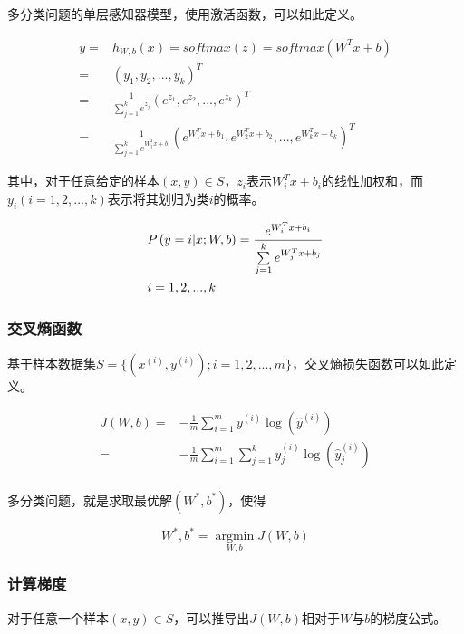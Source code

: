 \begin{content}
\begin{content}
多分类问题的单层感知器模型，使用激活函数，可以如此定义。

\[\begin{aligned}
  y =  & {h_{W,b}}(x) = softmax (z) = softmax ({W^T}x + b) \\ 
   =  & {\left( {{y_1},{y_2},...,{y_k}} \right)^T} \\ 
   =  & \frac{1}{{\sum\limits_{j = 1}^k {{e^{{z_j}}}} }}{\left( {{e^{{z_1}}},{e^{{z_2}}},...,{e^{{z_k}}}} \right)^T} \\ 
   =  & \frac{1}{{\sum\limits_{j = 1}^k {{e^{W_j^Tx + {b_j}}}} }}{\left( {{e^{W_1^Tx + {b_1}}},{e^{W_2^Tx + {b_2}}},...,{e^{W_k^Tx + {b_k}}}} \right)^T} \ 
\end{aligned} \]

其中，对于任意给定的样本$ (x, y) \in S $，$ z_i $表示$W_i^Tx+b_i$的线性加权和，而$y_i(i=1,2,...,k)$表示将其划归为类$i$的概率。

\[\begin{gathered}
  P\left( {y = i|x;W,b} \right) = \frac{{{e^{W_i^Tx + b_i}}}}{{\sum\limits_{j = 1}^k {{e^{W_j^Tx + b_j}}} }} \hfill \\
  i = 1,2,...,k \hfill \\ 
\end{gathered} \]


\subsubsection{交叉熵函数}

基于样本数据集$ S = \{ ({x^{(i)}},{y^{(i)}});i = 1,2,...,m\} $，交叉熵损失函数可以如此定义。

\[\begin{aligned}
  J(W,b) =  &  - \frac{1}{m}\sum\limits_{i = 1}^m {{y^{(i)}}\log \left( {{{\widehat y}^{(i)}}} \right)}  \\ 
   =  &  - \frac{1}{m}\sum\limits_{i = 1}^m {\sum\limits_{j = 1}^k {y_j^{(i)}\log \left( {\widehat y_j^{(i)}} \right)} }  \\
\end{aligned} \]

多分类问题，就是求取最优解$(W^*,b^*)$，使得

\[W^*,b^* = \mathop {\arg \min }\limits_{W,b} J(W,b)\]

\subsubsection{计算梯度}

对于任意一个样本$ (x,y) \in S $，可以推导出$ J(W,b) $相对于$ W $与$ b $的梯度公式。


\end{content}
\end{content}
